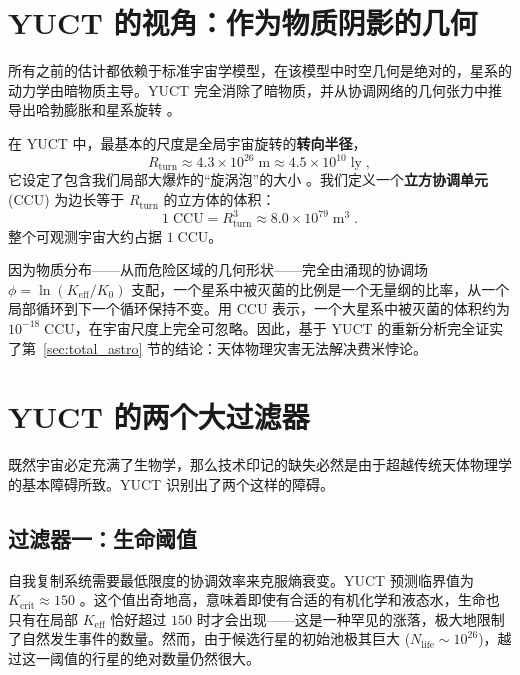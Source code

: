 \documentclass[11pt,a4paper]{article}
\newcommand{\Keff}{K_{\mathrm{eff}}}
\newcommand{\CCU}{\text{CCU}}
\begin{document}
	\section{YUCT 的视角：作为物质阴影的几何}
	\label{sec:yuct_geometry}
	所有之前的估计都依赖于标准宇宙学模型，在该模型中时空几何是绝对的，星系的动力学由暗物质主导。YUCT 完全消除了暗物质，并从协调网络的几何张力中推导出哈勃膨胀和星系旋转 \citep{YUCT,AppGravity}。
	
	在 YUCT 中，最基本的尺度是全局宇宙旋转的\textbf{转向半径}，
	\begin{equation}
		R_{\mathrm{turn}} \approx 4.3\times 10^{26}\;\mathrm{m}
		\approx 4.5\times 10^{10}\;\mathrm{ly}\;,
	\end{equation}
	它设定了包含我们局部大爆炸的“旋涡泡”的大小 \citep{AppOmega}。我们定义一个\textbf{立方协调单元} (CCU) 为边长等于 \(R_{\mathrm{turn}}\) 的立方体的体积：
	\begin{equation}
		1\;\CCU = R_{\mathrm{turn}}^{3} \approx 8.0\times 10^{79}\;\mathrm{m}^{3}\; .
	\end{equation}
	整个可观测宇宙大约占据 \(1\;\CCU\)。
	
	因为物质分布——从而危险区域的几何形状——完全由涌现的协调场 \(\phi = \ln(\Keff/K_{0})\) 支配，一个星系中被灭菌的比例是一个无量纲的比率，从一个局部循环到下一个循环保持不变。用 CCU 表示，一个大星系中被灭菌的体积约为 \(10^{-18}\;\CCU\)，在宇宙尺度上完全可忽略。因此，基于 YUCT 的重新分析完全证实了第~\ref{sec:total_astro} 节的结论：天体物理灾害无法解决费米悖论。
	
	\section{YUCT 的两个大过滤器}
	\label{sec:yuct_filters}
	既然宇宙必定充满了生物学，那么技术印记的缺失必然是由于超越传统天体物理学的基本障碍所致。YUCT 识别出了两个这样的障碍。
	
	\subsection{过滤器一：生命阈值}
	\label{sec:filter1}
	自我复制系统需要最低限度的协调效率来克服熵衰变。YUCT 预测临界值为 \(K_{\mathrm{crit}}\approx 150\) \citep{AppT}。这个值出奇地高，意味着即使有合适的有机化学和液态水，生命也只有在局部 \(K_{\mathrm{eff}}\) 恰好超过 \(150\) 时才会出现——这是一种罕见的涨落，极大地限制了自然发生事件的数量。然而，由于候选行星的初始池极其巨大 (\(N_{\mathrm{life}}\sim 10^{26}\))，越过这一阈值的行星的绝对数量仍然很大。
	
\end{document}
